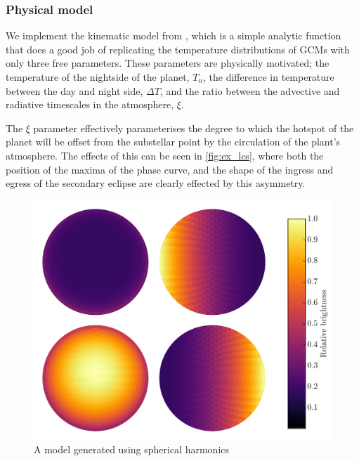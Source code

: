 \documentclass[a4paper,fleqn,usenatbib]{mnras}
\begin{document}
\subsubsection{Physical model}

We implement the kinematic model from \citet{Zhang2016}, which is a simple analytic function that does a good job of replicating the temperature distributions of GCMs with only three free parameters. These parameters are physically motivated; the temperature of the nightside of the planet, $T_n$, the difference in temperature between the day and night side, $\Delta T$, and the ratio between the advective and radiative timescales in the atmosphere, $\xi$.

The $\xi$ parameter effectively parameterises the degree to which the hotspot of the planet will be offset from the substellar point by the circulation of the plant's atmosphere. The effects of this can be seen in \ref{fig:ex_lcs}, where both the position of the maxima of the phase curve, and the shape of the ingress and egress of the secondary eclipse are clearly effected by this asymmetry.

\begin{figure}
\begin{center}
\includegraphics[width=\columnwidth]{img/sphere_quad.pdf}
\caption{A model generated using spherical harmonics}
\label{fig:harmonics}
\end{center}
\end{figure}
\end{document}
